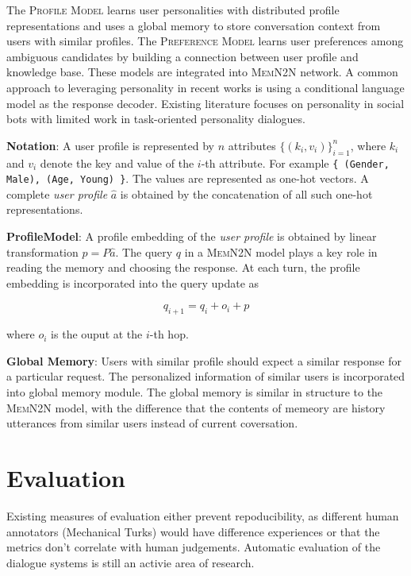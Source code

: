 \documentclass[11pt,a4paper]{article}
\begin{document}
The \textsc{Profile Model} learns user personalities with distributed profile representations and uses a global memory to store conversation context from users with similar profiles. The \textsc{Preference Model} learns user preferences among ambiguous candidates by building a connection between user profile and knowledge base. These models are integrated into \textsc{MemN2N} network. A common approach to leveraging personality in recent works is using a conditional language model as the response decoder. Existing literature \cite{Li2016APN} focuses on personality in social bots with limited work in task-oriented personality dialogues.

\medskip \noindent \textbf{Notation}: A user profile is represented by $n$ attributes $\{(k_i, v_i)\}^n_{i=1}$, where $k_i$ and $v_i$ denote the key and value of the $i$-th attribute. For example \texttt{\{ (Gender, Male), (Age, Young) \}}. The values are represented as one-hot vectors. A complete \textit{user profile} $\hat{a}$ is obtained by the concatenation of all such one-hot representations.

\medskip \noindent \textbf{ProfileModel}: A profile embedding of the \textit{user profile} is obtained by linear transformation $p = P\hat{a}$. The query $q$ in a \textsc{MemN2N} model plays a key role in reading the memory and choosing the response. At each turn, the profile embedding is incorporated into the query update as

\begin{equation}
  q_{i+1} = q_{i} + o_i + p
\end{equation}

\noindent where $o_i$ is the ouput at the $i$-th hop.

\medskip \noindent \textbf{Global Memory}: Users with similar profile should expect a similar response for a particular request. The personalized information of similar users is incorporated into global memory module. The global memory is similar in structure to the \textsc{MemN2N} model, with the difference that the contents of memeory are history utterances from similar users instead of current coversation.

\section{Evaluation}

Existing measures of evaluation either prevent repoducibility, as different human annotators (Mechanical Turks) would have difference experiences or that the metrics don't correlate with human judgements. Automatic evaluation of the dialogue systems is still an activie area of research. 
\end{document}
